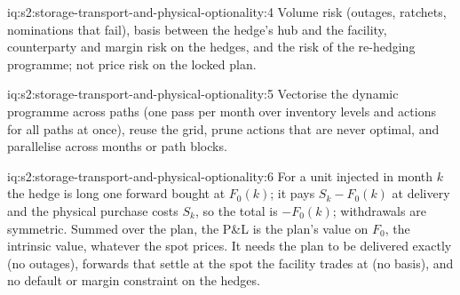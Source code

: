 \begin{solution}{iq:s2:storage-transport-and-physical-optionality:4}
Volume risk (outages, ratchets, nominations that fail), basis between the hedge's hub and the facility, counterparty and margin risk on the hedges,
and the risk of the re-hedging programme; not price risk on the locked plan.
\end{solution}

\begin{solution}{iq:s2:storage-transport-and-physical-optionality:5}
Vectorise the dynamic programme across paths (one pass per month over inventory levels and actions for all paths at once), reuse the grid, prune
actions that are never optimal, and parallelise across months or path blocks.
\end{solution}

\begin{solution}{iq:s2:storage-transport-and-physical-optionality:6}
For a unit injected in month $k$ the hedge is long one forward bought at $F_0(k)$; it pays $S_k - F_0(k)$ at delivery and the physical purchase costs
$S_k$, so the total is $-F_0(k)$; withdrawals are symmetric. Summed over the plan, the P\&L is the plan's value on $F_0$, the intrinsic value,
whatever the spot prices. It needs the plan to be delivered exactly (no outages), forwards that settle at the spot the facility trades at (no basis),
and no default or margin constraint on the hedges.
\end{solution}
